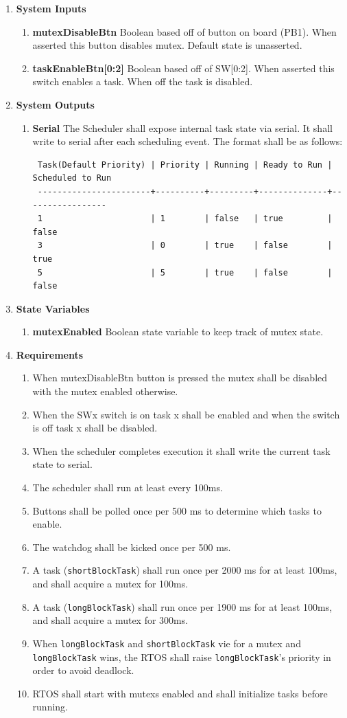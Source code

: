 \documentclass{article}
\newcommand{\bitem}[1]{\item \textbf{#1}}
\begin{document}
\begin{enumerate}
\bitem{System Inputs}
	\begin{enumerate}
	\bitem{mutexDisableBtn} Boolean based off of button on board (PB1). When asserted this button disables mutex. Default state is unasserted.
	\bitem{taskEnableBtn[0:2]} Boolean based off of SW[0:2]. When asserted this switch enables a task. When off the task is disabled.
	\end{enumerate}
\bitem{System Outputs}
	\begin{enumerate}
	\bitem{Serial} The Scheduler shall expose internal task state via serial. It shall write to serial after each scheduling event. The format shall be as follows:
\begin{verbatim}
 Task(Default Priority) | Priority | Running | Ready to Run | Scheduled to Run
 -----------------------+----------+---------+--------------+-----------------
 1                      | 1        | false   | true         | false
 3                      | 0        | true    | false        | true
 5                      | 5        | true    | false        | false
\end{verbatim}
	\end{enumerate}
\bitem{State Variables}
	\begin{enumerate}
	\bitem{mutexEnabled} Boolean state variable to keep track of mutex state.
	\end{enumerate}
\bitem{Requirements}
	\begin{enumerate}
	\item When mutexDisableBtn button is pressed the mutex shall be disabled with the mutex enabled otherwise.
	\item When the SWx switch is on task x shall be enabled and when the switch is off task x shall be disabled.
	\item When the scheduler completes execution it shall write the current task state to serial.
	\item The scheduler shall run at least every 100ms.
	\item Buttons shall be polled once per 500 ms to determine which tasks to enable.
	\item The watchdog shall be kicked once per 500 ms.
	\item A task (\texttt{shortBlockTask}) shall run once per 2000 ms for at least 100ms, and shall acquire a mutex for 100ms.
	\item A task (\texttt{longBlockTask}) shall run once per 1900 ms for at least 100ms, and shall acquire a mutex for 300ms.
	\item When \texttt{longBlockTask} and \texttt{shortBlockTask} vie for a mutex and \texttt{longBlockTask} wins, the RTOS shall raise \texttt{longBlockTask}'s priority in order to avoid deadlock.
	\item RTOS shall start with mutexs enabled and shall initialize tasks before running.
	\end{enumerate}
\end{enumerate}
\end{document}

